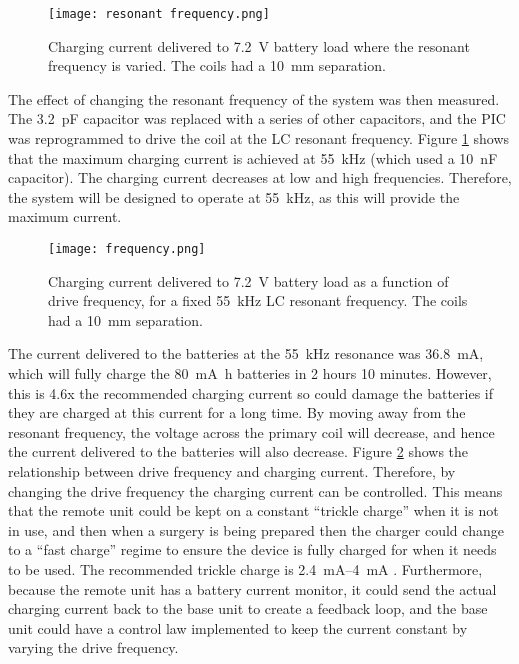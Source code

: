 \begin{figure}[htbp]
	\centering
	\texttt{[image: resonant frequency.png]}
	\caption{Charging current delivered to \SI{7.2}{\volt} battery load where the resonant frequency is varied. The coils had a \SI{10}{\milli\metre} separation.}
	\label{fig: current resonance}
\end{figure}

The effect of changing the resonant frequency of the system was then measured. The \SI{3.2}{\pico\farad} capacitor was replaced with a series of other capacitors, and the PIC was reprogrammed to drive the coil at the LC resonant frequency. Figure \ref{fig: current resonance} shows that the maximum charging current is achieved at \SI{55}{\kilo\hertz} (which used a \SI{10}{\nano\farad} capacitor). The charging current decreases at low and high frequencies. %
Therefore, the system will be designed to operate at \SI{55}{\kilo\hertz}, as this will provide the maximum current.\\

\begin{figure}[htbp]
	\centering
	\texttt{[image: frequency.png]}
	\caption{Charging current delivered to \SI{7.2}{\volt} battery load as a function of drive frequency, for a fixed \SI{55}{\kilo\hertz} LC resonant frequency. The coils had a \SI{10}{\milli\metre} separation.}
	\label{fig: current frequency}
\end{figure}

The current delivered to the batteries at the \SI{55}{\kilo\hertz} resonance was \SI{36.8}{\milli\ampere}, which will fully charge the \SI{80}{\milli\ampere\hour} batteries in 2 hours 10 minutes. However, this is 4.6x the recommended charging current so could damage the batteries if they are charged at this current for a long time. By moving away from the resonant frequency, the voltage across the primary coil will decrease, and hence the current delivered to the batteries will also decrease. Figure \ref{fig: current frequency} shows the relationship between drive frequency and charging current. Therefore, by changing the drive frequency the charging current can be controlled. This means that the remote unit could be kept on a constant ``trickle charge'' when it is not in use, and then when a surgery is being prepared then the charger could change to a ``fast charge'' regime to ensure the device is fully charged for when it needs to be used. The recommended trickle charge is \SIrange{2.4}{4}{\milli\ampere} \cite{rs_pro_batteries}. Furthermore, because the remote unit has a battery current monitor, it could send the actual charging current back to the base unit to create a feedback loop, and the base unit could have a control law implemented to keep the current constant by varying the drive frequency.\\

